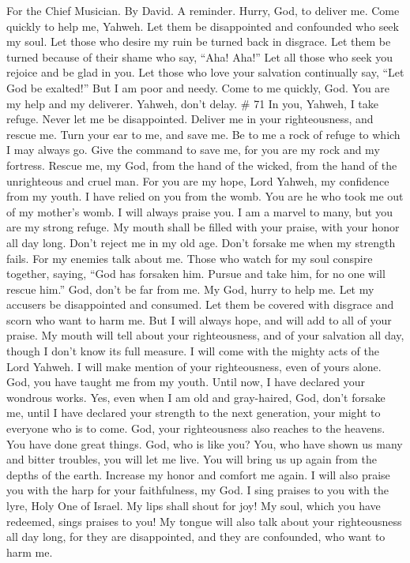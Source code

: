 For the Chief Musician. By David. A reminder.  Hurry, God,
to deliver me. Come quickly to help me, Yahweh.  Let them
be disappointed and confounded who seek my soul. Let those who desire my
ruin be turned back in disgrace.  Let them be turned
because of their shame who say, ``Aha! Aha!''  Let all
those who seek you rejoice and be glad in you. Let those who love your
salvation continually say, ``Let God be exalted!''  But I
am poor and needy. Come to me quickly, God. You are my help and my
deliverer. Yahweh, don't delay. \# 71  In you, Yahweh, I
take refuge. Never let me be disappointed.  Deliver me in
your righteousness, and rescue me. Turn your ear to me, and save me.
 Be to me a rock of refuge to which I may always go. Give
the command to save me, for you are my rock and my fortress.
 Rescue me, my God, from the hand of the wicked, from the
hand of the unrighteous and cruel man.  For you are my
hope, Lord Yahweh, my confidence from my youth.  I have
relied on you from the womb. You are he who took me out of my mother's
womb. I will always praise you.  I am a marvel to many,
but you are my strong refuge.  My mouth shall be filled
with your praise, with your honor all day long.  Don't
reject me in my old age. Don't forsake me when my strength fails.
 For my enemies talk about me. Those who watch for my
soul conspire together,  saying, ``God has forsaken him.
Pursue and take him, for no one will rescue him.''  God,
don't be far from me. My God, hurry to help me.  Let my
accusers be disappointed and consumed. Let them be covered with disgrace
and scorn who want to harm me.  But I will always hope,
and will add to all of your praise.  My mouth will tell
about your righteousness, and of your salvation all day, though I don't
know its full measure.  I will come with the mighty acts
of the Lord Yahweh. I will make mention of your righteousness, even of
yours alone.  God, you have taught me from my youth.
Until now, I have declared your wondrous works.  Yes,
even when I am old and gray-haired, God, don't forsake me, until I have
declared your strength to the next generation, your might to everyone
who is to come.  God, your righteousness also reaches to
the heavens. You have done great things. God, who is like you?
 You, who have shown us many and bitter troubles, you
will let me live. You will bring us up again from the depths of the
earth.  Increase my honor and comfort me again.
 I will also praise you with the harp for your
faithfulness, my God. I sing praises to you with the lyre, Holy One of
Israel.  My lips shall shout for joy! My soul, which you
have redeemed, sings praises to you!  My tongue will also
talk about your righteousness all day long, for they are disappointed,
and they are confounded, who want to harm me.

